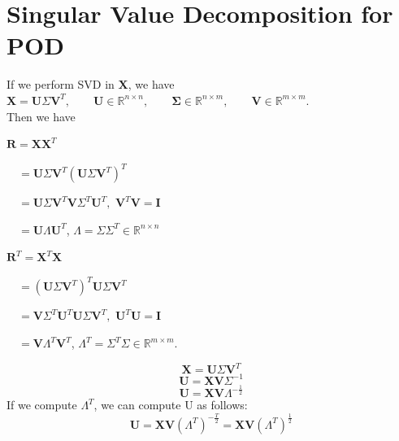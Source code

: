 \documentclass[12pt]{article}
\begin{document}
\section{Singular Value Decomposition for POD}\label{a3}
If we perform SVD in $\mathbf{X}$, we have \\
$\mathbf{X}=\mathbf{U}\Sigma \mathbf{V}^T, \qquad \mathbf{U}\in\mathbb{R}^{n \times n},\qquad \mathbf{\Sigma}\in\mathbb{R}^{n \times m}, \qquad \mathbf{V}\in\mathbb{R}^{m \times m}.$\\
Then we have 
\begin{itemize}
\begin{minipage}{.5\textwidth}
\item[]  $\mathbf{R}= \mathbf{X}\mathbf{X}^T$
 \item[] $\quad=\mathbf{U}\Sigma \mathbf{V}^T(\mathbf{U}\Sigma \mathbf{V}^T)^T$
 \item[] $\quad=\mathbf{U}\Sigma \mathbf{V}^T\mathbf{V}\Sigma ^T\mathbf{U}^T,$ $\mathbf{V}^T\mathbf{V}=\mathbf{I}$ 
  \item[] $\quad=\mathbf{U}\Lambda \mathbf{U}^T$, 
  $\Lambda=\Sigma\Sigma ^T \in\mathbb{R}^{n \times n}$ 
\end{minipage}%
\begin{minipage}{.4\textwidth}
\item[] $\mathbf{R}^T= \mathbf{X}^T\mathbf{X}$
 \item[] $\quad=(\mathbf{U}\Sigma \mathbf{V}^T)^T\mathbf{U}\Sigma \mathbf{V}^T$
 \item[] $\quad=\mathbf{V}\Sigma ^T\mathbf{U}^T\mathbf{U}\Sigma \mathbf{V}^T,$ $\mathbf{U}^T\mathbf{U}=\mathbf{I}$ 
  \item[] $\quad=\mathbf{V}\Lambda^T \mathbf{V}^T$, 
  $\Lambda^T=\Sigma ^T\Sigma \in\mathbb{R}^{m \times m}.$
\end{minipage}
\end{itemize}
$$\mathbf{X}=\mathbf{U}\Sigma \mathbf{V}^T$$
$$\mathbf{U}=\mathbf{X}\mathbf{V}\Sigma^{-1}$$
$$\mathbf{U}=\mathbf{X}\mathbf{V}\Lambda^{-\frac{1}{2}}$$
If we compute $\Lambda^T$, we can compute U as follows:
$$\mathbf{U}=\mathbf{X}\mathbf{V}(\Lambda^T)^{-\frac{T}{2}}=\mathbf{X}\mathbf{V}(\Lambda^T)^{\frac{1}{2}}$$
\newpage
\end{document}
